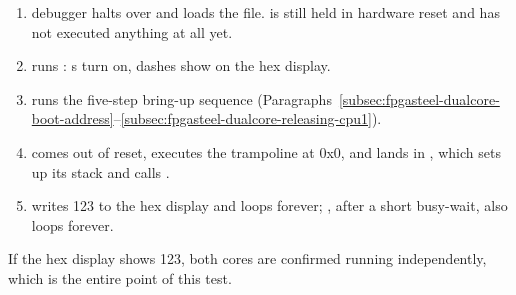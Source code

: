 \begin{enumerate}
    \item {} debugger halts  over  and loads the  file.  is still held in hardware reset and has not executed anything at all yet.
    \item {} runs : s turn on, dashes show on the hex display.
    \item {} runs the five-step bring-up sequence (Paragraphs~\ref{subsec:fpgasteel-dualcore-boot-address}--\ref{subsec:fpgasteel-dualcore-releasing-cpu1}).
    \item {} comes out of reset, executes the trampoline at 0x0, and lands in , which sets up its stack and calls .
    \item {} writes 123 to the hex display and loops forever; , after a short busy-wait, also loops forever.
\end{enumerate}

If the hex display shows 123, both cores are confirmed running independently, which is the entire point of this test.